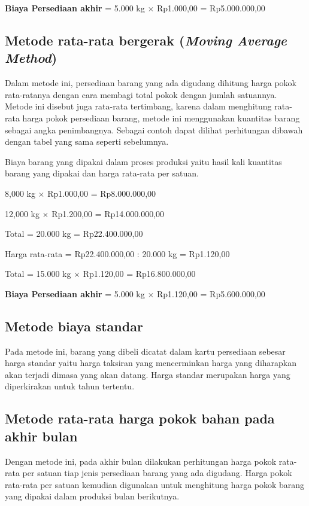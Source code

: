 \textbf{Biaya Persediaan akhir} = 5.000 kg $\times$ Rp1.000,00 = Rp5.000.000,00

\subsection{Metode rata-rata bergerak (\textit{Moving Average Method})}

Dalam metode ini, persediaan barang yang ada digudang dihitung harga pokok rata-ratanya dengan cara membagi total pokok dengan jumlah satuannya. Metode ini disebut juga rata-rata tertimbang, karena dalam menghitung rata-rata harga pokok persediaan barang, metode ini menggunakan kuantitas barang sebagai angka penimbangnya. Sebagai contoh dapat dilihat perhitungan dibawah dengan tabel yang sama seperti sebelumnya.

Biaya barang yang dipakai dalam proses produksi yaitu hasil kali kuantitas barang yang dipakai dan harga rata-rata per satuan.

8,000 kg $\times$ Rp1.000,00 = Rp8.000.000,00

12,000 kg $\times$ Rp1.200,00 = Rp14.000.000,00

Total = 20.000 kg = Rp22.400.000,00

Harga rata-rata = Rp22.400.000,00 : 20.000 kg = Rp1.120,00

Total = 15.000 kg $\times$ Rp1.120,00 = Rp16.800.000,00

\textbf{Biaya Persediaan akhir} = 5.000 kg $\times$ Rp1.120,00 = Rp5.600.000,00

\subsection{Metode biaya standar}

Pada metode ini, barang yang dibeli dicatat dalam kartu persediaan sebesar harga standar yaitu harga taksiran yang mencerminkan harga yang diharapkan akan terjadi dimasa yang akan datang. Harga standar merupakan harga yang diperkirakan untuk tahun tertentu.

\subsection{Metode rata-rata harga pokok bahan pada akhir bulan}

Dengan metode ini, pada akhir bulan dilakukan perhitungan harga pokok rata-rata per satuan tiap jenis persediaan barang yang ada digudang. Harga pokok rata-rata per satuan kemudian digunakan untuk menghitung harga pokok barang yang dipakai dalam produksi bulan berikutnya.

